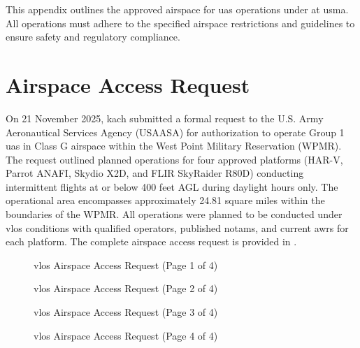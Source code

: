 \label{ch:airspace}
This appendix outlines the approved airspace for \ac{uas} operations under \projectmars at \ac{usma}. All operations must adhere to the specified airspace restrictions and guidelines to ensure safety and regulatory compliance.

\section{Airspace Access Request}\label{sec:airspace-request}

On 21 November 2025, \ac{kach} submitted a formal request to the U.S. Army Aeronautical Services Agency (USAASA) for authorization to operate Group 1 \ac{uas} in Class G airspace within the West Point Military Reservation (WPMR). The request outlined planned operations for four approved platforms (HAR-V, Parrot ANAFI, Skydio X2D, and FLIR SkyRaider R80D) conducting intermittent flights at or below 400 feet AGL during daylight hours only. The operational area encompasses approximately 24.81 square miles within the boundaries of the WPMR. All operations were planned to be conducted under \ac{vlos} conditions with qualified operators, published \ac{notam}s, and current \ac{awr}s for each platform. The complete airspace access request is provided in .

\begin{figure}[p]
    \centering
    \caption{\ac{vlos} Airspace Access Request (Page 1 of 4)}
    \label{fig:vlos-request}
\end{figure}

\begin{figure}[p]
    \centering
    \caption{\ac{vlos} Airspace Access Request (Page 2 of 4)}
\end{figure}

\begin{figure}[p]
    \centering
    \caption{\ac{vlos} Airspace Access Request (Page 3 of 4)}
\end{figure}

\begin{figure}[p]
    \centering
    \caption{\ac{vlos} Airspace Access Request (Page 4 of 4)}
\end{figure}

